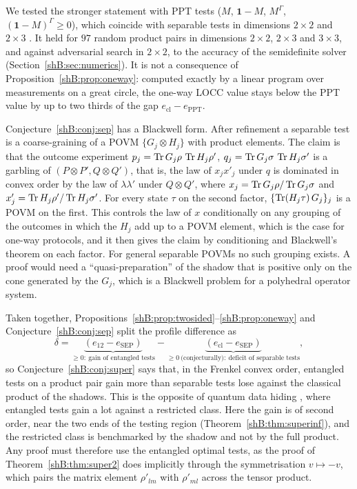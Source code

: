 We tested the stronger statement with PPT tests ($M$, $\mathbf 1-M$, $M^{\Gamma}$, $(\mathbf 1-M)^{\Gamma}\ge0$), which coincide with separable tests in dimensions $2\times2$ and $2\times3$ \cite{Horodecki1996}. It held for $97$ random product pairs in dimensions $2\times2$, $2\times3$ and $3\times3$, and against adversarial search in $2\times2$, to the accuracy of the semidefinite solver (Section~\ref{shB:sec:numerics}). It is not a consequence of Proposition~\ref{shB:prop:oneway}: computed exactly by a linear program over measurements on a great circle, the one-way LOCC value stays below the PPT value by up to two thirds of the gap $e_{\mathrm{cl}}-e_{\mathrm{PPT}}$.

Conjecture~\ref{shB:conj:sep} has a Blackwell form. After refinement a separable test is a coarse-graining of a POVM $\{G_j\otimes H_j\}$ with product elements. The claim is that the outcome experiment $p_j=\operatorname{Tr} G_j\rho\,\operatorname{Tr} H_j\rho'$, $q_j=\operatorname{Tr} G_j\sigma\,\operatorname{Tr} H_j\sigma'$ is a garbling of $(P\otimes P',Q\otimes Q')$, that is, the law of $x_jx'_j$ under $q$ is dominated in convex order by the law of $\lambda\lambda'$ under $Q\otimes Q'$, where $x_j=\operatorname{Tr} G_j\rho/\operatorname{Tr} G_j\sigma$ and $x'_j=\operatorname{Tr} H_j\rho'/\operatorname{Tr} H_j\sigma'$. For every state $\tau$ on the second factor, $\{\operatorname{Tr}(H_j\tau)\,G_j\}_j$ is a POVM on the first. This controls the law of $x$ conditionally on any grouping of the outcomes in which the $H_j$ add up to a POVM element, which is the case for one-way protocols, and it then gives the claim by conditioning and Blackwell's theorem on each factor. For general separable POVMs no such grouping exists. A proof would need a ``quasi-preparation'' of the shadow that is positive only on the cone generated by the $G_j$, which is a Blackwell problem for a polyhedral operator system.

Taken together, Propositions~\ref{shB:prop:twosided}--\ref{shB:prop:oneway} and Conjecture~\ref{shB:conj:sep} split the profile difference as
\[
\delta=\underbrace{(e_{12}-e_{\mathrm{SEP}})}_{\ge0:\ \text{gain of entangled tests}}-\underbrace{(e_{\mathrm{cl}}-e_{\mathrm{SEP}})}_{\ge0\ \text{(conjecturally)}:\ \text{deficit of separable tests}} ,
\]
so Conjecture~\ref{shB:conj:super} says that, in the Frenkel convex order, entangled tests on a product pair gain more than separable tests lose against the classical product of the shadows. This is the opposite of quantum data hiding \cite{MatthewsWehnerWinter2009}, where entangled tests gain a lot against a restricted class. Here the gain is of second order, near the two ends of the testing region (Theorem~\ref{shB:thm:superinf}), and the restricted class is benchmarked by the shadow and not by the full product. Any proof must therefore use the entangled optimal tests, as the proof of Theorem~\ref{shB:thm:super2} does implicitly through the symmetrisation $v\mapsto-v$, which pairs the matrix element $\rho'_{lm}$ with $\rho'_{ml}$ across the tensor product.


